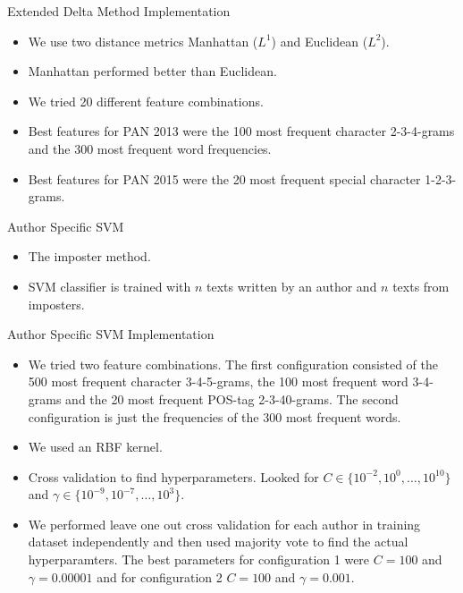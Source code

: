 \documentclass[10pt]{beamer}
\begin{document}
\begin{frame}[fragile]{Extended Delta Method Implementation}

    \begin{itemize}
        \item We use two distance metrics Manhattan ($L^1$) and Euclidean
            ($L^2$).
        \item Manhattan performed better than Euclidean.

        \item We tried 20 different feature combinations.
        \item Best features for PAN 2013 were the 100 most frequent character
            2-3-4-grams and the 300 most frequent word frequencies.
        \item Best features for PAN 2015 were the 20 most frequent special
            character 1-2-3-grams.
    \end{itemize}

\end{frame}

\begin{frame}[fragile]{Author Specific SVM}

    \begin{itemize}
        \item The imposter method.
        \item SVM classifier is trained with $n$ texts written by an author and
            $n$ texts from imposters.
    \end{itemize}

\end{frame}

\begin{frame}[fragile]{Author Specific SVM Implementation}

    \begin{itemize}
        \item We tried two feature combinations. The first configuration
            consisted of the 500 most frequent character 3-4-5-grams, the 100
            most frequent word 3-4-grams and the 20 most frequent POS-tag
            2-3-40-grams. The second configuration is just the frequencies of
            the 300 most frequent words.
        \item We used an RBF kernel.
        \item Cross validation to find hyperparameters. Looked for $C \in
            \{10^{-2}, 10^0, \dots, 10^{10}\}$ and $\gamma \in \{10^{-9},
            10^{-7}, \dots, 10^3\}$.
        \item We performed leave one out cross validation for each author in
            training dataset independently and then used majority vote to find
            the actual hyperparamters. The best parameters for configuration 1
            were $C = 100$ and $\gamma = 0.00001$ and for configuration 2
            $C = 100$ and $\gamma = 0.001$.
    \end{itemize}

\end{frame}
\end{document}
